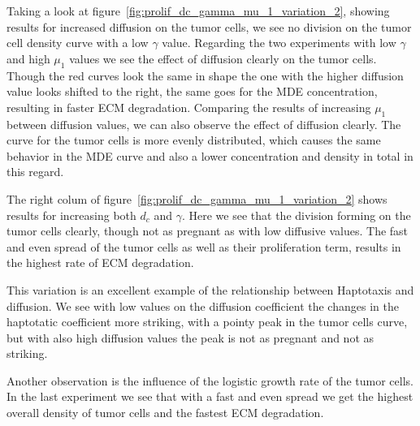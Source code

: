 Taking a look at figure~\ref{fig:prolif_dc_gamma_mu_1_variation_2}, showing results for increased diffusion on the tumor cells, we see no division on the tumor cell density curve with a low $\gamma$ value. Regarding the two experiments with low $\gamma$ and high $\mu_1$ values we see the effect of diffusion clearly on the tumor cells. Though the red curves look the same in shape the one with the higher diffusion value looks shifted to the right, the same goes for the MDE concentration, resulting in faster ECM degradation. Comparing the results of increasing $\mu_1$ between diffusion values, we can also observe the effect of diffusion clearly. The curve for the tumor cells is more evenly distributed, which causes the same behavior in the MDE curve and also a lower concentration and density in total in this regard.

The right colum of figure~\ref{fig:prolif_dc_gamma_mu_1_variation_2} shows results for increasing both $d_c$ and $\gamma$. Here we see that the division forming on the tumor cells clearly, though not as pregnant as with low diffusive values. The fast and even spread of the tumor cells as well as their proliferation term, results in the highest rate of ECM degradation. 

This variation is an excellent example of the relationship between Haptotaxis and diffusion. We see with low values on the diffusion coefficient the changes in the haptotatic coefficient more striking, with a pointy peak in the tumor cells curve, but with also high diffusion values the peak is not as pregnant and not as striking. 

Another observation is the influence of the logistic growth rate of the tumor cells. In the last experiment we see that with a fast and even spread we get the highest overall density of tumor cells and the fastest ECM degradation.

